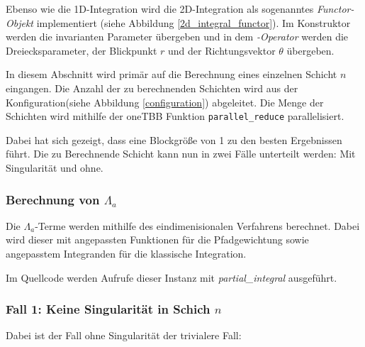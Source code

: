 Ebenso wie die 1D-Integration wird die 2D-Integration als sogenanntes \textit{Functor-Objekt} implementiert (siehe Abbildung \ref{2d_integral_functor}). 
Im Konstruktor werden die invarianten Parameter übergeben und in dem \textit{\(\)-Operator} werden die Dreiecksparameter, der Blickpunkt $r$ und der Richtungsvektor $\theta$ übergeben.

In diesem Abschnitt wird primär auf die Berechnung eines einzelnen Schicht $n$ eingangen. Die Anzahl der zu berechnenden Schichten wird aus der Konfiguration(siehe Abbildung \ref{configuration}) abgeleitet. 
Die Menge der Schichten wird mithilfe der oneTBB Funktion \texttt{parallel\_reduce} parallelisiert.

\begin{center}
    
    \label{2d_integral_parallel}
\end{center}

Dabei hat sich gezeigt, dass eine Blockgröße von 1 zu den besten Ergebnissen führt.
Die zu Berechnende Schicht kann nun in zwei Fälle unterteilt werden: Mit Singularität und ohne.

\subsubsection*{Berechnung von $\Lambda_a$}

Die $\Lambda_a$-Terme werden mithilfe des eindimenisionalen Verfahrens berechnet.
Dabei wird dieser mit angepassten Funktionen für die Pfadgewichtung sowie angepasstem Integranden für die klassische Integration.

\begin{center}
    
\end{center}

Im Quellcode werden Aufrufe dieser Instanz mit \textit{partial\_integral} ausgeführt.

\subsubsection*{Fall 1: Keine Singularität in Schich $n$}

Dabei ist der Fall ohne Singularität der trivialere Fall:

\begin{center}
    
    \label{2d_integral_trivial}
\end{center}


